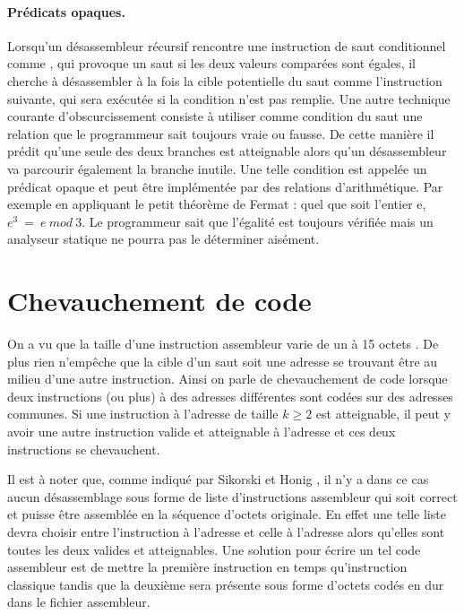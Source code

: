 \paragraph{Prédicats opaques.}
Lorsqu'un désassembleur récursif rencontre une instruction de saut conditionnel comme \je, qui provoque un saut si les deux valeurs comparées sont égales, il cherche à désassembler à la fois la cible potentielle du saut comme l'instruction suivante, qui sera exécutée si la condition n'est pas remplie.
Une autre technique courante d'obscurcissement \cite{MKK07} consiste à utiliser comme condition du saut une relation que le programmeur sait toujours vraie ou fausse. De cette manière il prédit qu'une seule des deux branches est atteignable alors qu'un désassembleur va parcourir également la branche inutile.
Une telle condition est appelée un prédicat opaque et peut être implémentée par des relations d'arithmétique. Par exemple en appliquant le petit théorème de Fermat \cite{fermat} : quel que soit l'entier e, $e^3\ =\ e\ mod\ 3$.
Le programmeur sait que l'égalité est toujours vérifiée mais un analyseur statique ne pourra pas le déterminer aisément.


\section{Chevauchement de code}
On a vu que la taille d'une instruction assembleur varie de un à 15 octets .
De plus rien n'empêche que la cible d'un saut soit une adresse se trouvant être au milieu d'une autre instruction.
Ainsi on parle de chevauchement de code lorsque deux instructions (ou plus) à des adresses différentes sont codées sur des adresses communes. Si une instruction à l'adresse  de taille $k\geq 2$ est atteignable, il peut y avoir une autre instruction valide et atteignable à l'adresse  et ces deux instructions se chevauchent.

Il est à noter que, comme indiqué par Sikorski et Honig \cite{PMA}, il n'y a dans ce cas aucun désassemblage sous forme de liste d'instructions assembleur qui soit correct et puisse être assemblée en la séquence d'octets originale. En effet une telle liste devra choisir entre l'instruction à l'adresse  et celle à l'adresse  alors qu'elles sont toutes les deux valides et atteignables. Une solution pour écrire un tel code assembleur est de mettre la première instruction en temps qu'instruction classique tandis que la deuxième sera présente sous forme d'octets codés en dur dans le fichier assembleur.

